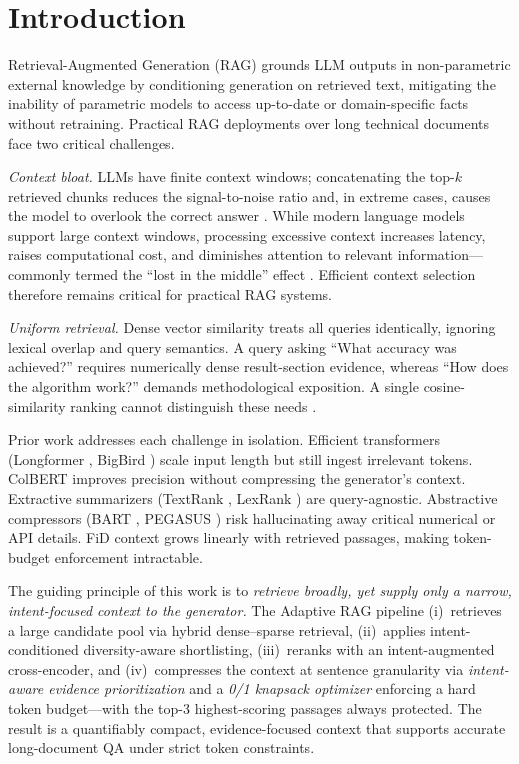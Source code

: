 \documentclass[conference]{IEEEtran}
\begin{document}
\section{Introduction}

Retrieval-Augmented Generation (RAG) \cite{lewis2020rag}
grounds LLM outputs in non-parametric external knowledge by
conditioning generation on retrieved text, mitigating the
inability of parametric models to access up-to-date or
domain-specific facts without retraining. Practical RAG
deployments over long technical documents face two critical
challenges.

\textit{Context bloat.} LLMs have finite context windows;
concatenating the top-$k$ retrieved chunks reduces the
signal-to-noise ratio and, in extreme cases, causes the model
to overlook the correct answer \cite{beltagy2020longformer,
lewis2020rag}. While modern language models support large
context windows, processing excessive context increases
latency, raises computational cost, and diminishes attention
to relevant information---commonly termed the
``lost in the middle'' effect \cite{beltagy2020longformer}.
Efficient context selection therefore remains critical for
practical RAG systems.

\textit{Uniform retrieval.} Dense vector similarity treats
all queries identically, ignoring lexical overlap and query
semantics. A query asking ``What accuracy was achieved?''
requires numerically dense result-section evidence, whereas
``How does the algorithm work?'' demands methodological
exposition. A single cosine-similarity ranking cannot
distinguish these needs \cite{karpukhin2020dpr}.

Prior work addresses each challenge in isolation.
Efficient transformers (Longformer \cite{beltagy2020longformer},
BigBird \cite{zaheer2020bigbird}) scale input length but still
ingest irrelevant tokens. ColBERT \cite{khattab2020colbert}
improves precision without compressing the generator's context.
Extractive summarizers (TextRank \cite{mihalcea2004textrank},
LexRank \cite{erkan2004lexrank}) are query-agnostic.
Abstractive compressors (BART \cite{lewis2020bart}, PEGASUS
\cite{zhang2020pegasus}) risk hallucinating away critical
numerical or API details. FiD \cite{izacard2021fid} context
grows linearly with retrieved passages, making token-budget
enforcement intractable.

The guiding principle of this work is to \emph{retrieve broadly, yet supply only a narrow, intent-focused context to the generator.} The Adaptive RAG
pipeline (i)~retrieves a large candidate pool via hybrid
dense--sparse retrieval, (ii)~applies intent-conditioned
diversity-aware shortlisting, (iii)~reranks with an
intent-augmented cross-encoder, and (iv)~compresses the context
at sentence granularity via \emph{intent-aware evidence
prioritization} and a \emph{0/1 knapsack optimizer} enforcing
a hard token budget---with the top-3 highest-scoring passages
always protected. The result is a quantifiably compact,
evidence-focused context that supports accurate long-document
QA under strict token constraints.
\end{document}

